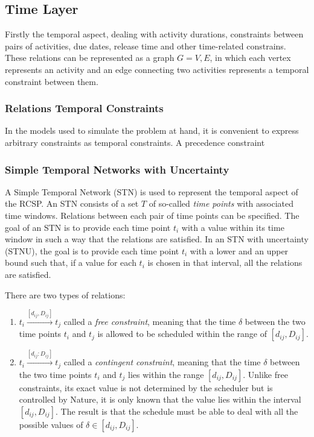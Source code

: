 \documentclass{article}
\begin{document}
\subsection{Time Layer}
Firstly the temporal aspect, dealing with activity durations, constraints between pairs of activities, due dates, release time and other time-related constrains. These relations can be represented as a graph $G={V,E}$, in which each vertex represents an activity and an edge connecting two activities represents a temporal constraint between them.

\subsubsection{Relations Temporal Constraints}
In the models used to simulate the problem at hand, it is convenient to express arbitrary constraints as temporal constraints. A precedence constraint 


\subsubsection{Simple Temporal Networks with Uncertainty}
A Simple Temporal Network (STN) is used to represent the temporal aspect of the RCSP. An STN consists of a set $T$ of so-called \emph{time points} with associated time windows. Relations between each pair of time points can be specified. The goal of an STN is to provide each time point $t_i$ with a value within its time window in such a way that the relations are satisfied. In an STN with uncertainty (STNU), the goal is to provide each time point $t_i$ with a lower and an upper bound such that, if a value for each $t_i$ is chosen in that interval, all the relations are satisfied.

There are two types of relations:
\begin{enumerate}
\item $t_i \xrightarrow{[d_{ij},D_{ij}]} t_j$ called a \emph{free constraint}, meaning that the time $\delta$ between the two time points $t_i$ and $t_j$ is allowed to be scheduled within the range of $[d_{ij},D_{ij}]$.
\item $t_i \xrightarrow{[d_{ij}:D_{ij}]} t_j$ called a \emph{contingent constraint}, meaning that the time $\delta$ between the two time points $t_i$ and $t_j$ lies within the range $[d_{ij},D_{ij}]$. Unlike free constraints, its exact value is not determined by the scheduler but is controlled by Nature, it is only known that the value lies within the interval $[d_{ij},D_{ij}]$. The result is that the schedule must be able to deal with all the possible values of $\delta \in [d_{ij},D_{ij}]$.
\end{enumerate}
\end{document}
